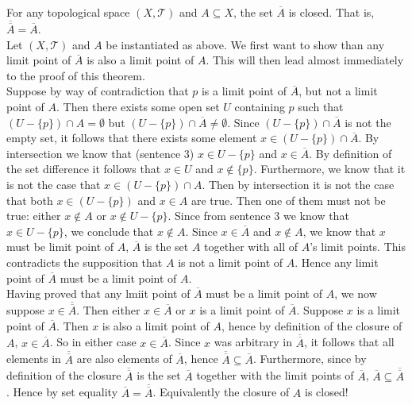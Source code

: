 \documentclass{article}
\theoremstyle{definition}
\newcommand{\topT}{\mathcal{T}}
\begin{document}
 For any topological space $(X,\topT)$ and $A\subseteq X$, the set $\overline{A}$ is closed. That is, $\overline{\overline{A}} = \overline{A}$.\\

 Let $(X,\topT)$ and $A$ be instantiated as above. We first want to show than any limit point of $\overline{A}$ is also a limit point of $A$. This will then lead almost immediately to the proof of this theorem.\\

Suppose by way of contradiction that $p$ is a limit point of $\overline{A}$, but not a limit point of $A$. Then there exists some open set $U$ containing $p$ such that $(U- \{p\})\cap A = \emptyset$ but $(U- \{p\}) \cap \overline{A} \ne \emptyset$. Since $(U- \{p\}) \cap \overline{A}$ is not the empty set, it follows that there exists some element $x\in (U- \{p\}) \cap \overline{A}$. By intersection we know that (sentence 3) $x\in U- \{p\}$ and $x\in \overline{A}$. By definition of the set difference it follows that $x\in U$ and $x\not \in \{p\}$. Furthermore, we know that it is not the case that $x\in (U- \{p\})\cap A$. Then by intersection it is not the case that both $x\in (U-\{p\})$ and $x\in A$ are true. Then one of them must not be true: either $x\not\in A$ or $x\not \in U-\{p\}$. Since from sentence 3 we know that $x\in U-\{p\}$, we conclude that $x\not \in A$. Since $x\in \overline{A}$ and $x\not\in A$, we know that $x$ must be limit point of $A$, $\overline{A}$ is the set $A$ together with all of $A$'s limit points. This contradicts the supposition that $A$ is not a limit point of $A$. Hence any limit point of $\overline{A}$ must be a limit point of $A$.\\

Having proved that any lmiit point of $\overline{A}$ must be a limit point of $A$, we now suppose $x\in \overline{\overline{A}}$. Then either $x\in \overline{A}$ or $x$ is a limit point of $\overline{A}$. Suppose $x$ is a limit point of $\overline{A}$. Then $x$ is also a limit point of $A$, hence by definition of the closure of $A$, $x\in \overline{A}$. So in either case $x\in \overline{A}$. Since $x$ was arbitrary in $\overline{\overline{A}}$, it follows that all elements in $\overline{\overline{A}}$ are also elements of $\overline{A}$, hence $\overline{\overline{A}}\subseteq \overline{A}$. Furthermore, since by definition of the closure $\overline{\overline{A}}$ is the set $\overline{A}$ together with the limit points of $\overline{A}$, $\overline{A}\subseteq \overline{\overline{A}}$. Hence by set equality $\overline{A} = \overline{\overline{A}}$. Equivalently the closure of $A$ is closed!\\
\end{document}
